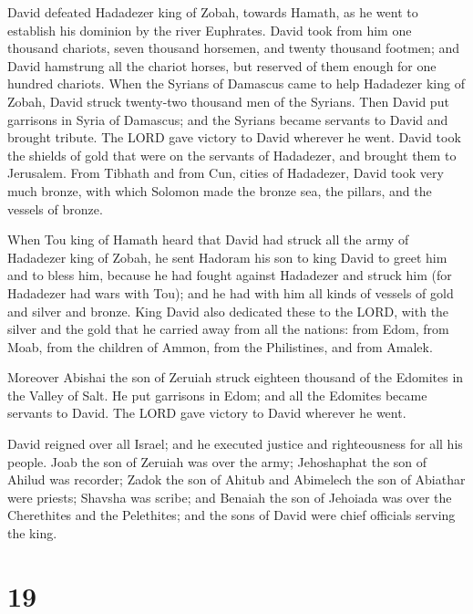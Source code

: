  David defeated Hadadezer king of Zobah, towards Hamath,
as he went to establish his dominion by the river Euphrates.
 David took from him one thousand chariots, seven thousand
horsemen, and twenty thousand footmen; and David hamstrung all the
chariot horses, but reserved of them enough for one hundred chariots.
 When the Syrians of Damascus came to help Hadadezer king
of Zobah, David struck twenty-two thousand men of the Syrians.
 Then David put garrisons in Syria of Damascus; and the
Syrians became servants to David and brought tribute. The LORD gave
victory to David wherever he went.  David took the shields
of gold that were on the servants of Hadadezer, and brought them to
Jerusalem.  From Tibhath and from Cun, cities of
Hadadezer, David took very much bronze, with which Solomon made the
bronze sea, the pillars, and the vessels of bronze.

 When Tou king of Hamath heard that David had struck all
the army of Hadadezer king of Zobah,  he sent Hadoram his
son to king David to greet him and to bless him, because he had fought
against Hadadezer and struck him (for Hadadezer had wars with Tou); and
he had with him all kinds of vessels of gold and silver and bronze.
 King David also dedicated these to the LORD, with the
silver and the gold that he carried away from all the nations: from
Edom, from Moab, from the children of Ammon, from the Philistines, and
from Amalek.

 Moreover Abishai the son of Zeruiah struck eighteen
thousand of the Edomites in the Valley of Salt.  He put
garrisons in Edom; and all the Edomites became servants to David. The
LORD gave victory to David wherever he went.

 David reigned over all Israel; and he executed justice
and righteousness for all his people.  Joab the son of
Zeruiah was over the army; Jehoshaphat the son of Ahilud was recorder;
 Zadok the son of Ahitub and Abimelech the son of
Abiathar were priests; Shavsha was scribe;  and Benaiah
the son of Jehoiada was over the Cherethites and the Pelethites; and the
sons of David were chief officials serving the king.

\hypertarget{section-18}{%
\section{19}\label{section-18}}

